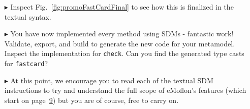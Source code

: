 \begin{itemize}
\vspace{0.5cm}

\item[$\blacktriangleright$] Inspect Fig.~\ref{fig:promoFastCardFinal} to see how this is finalized in the textual syntax.

\item[$\blacktriangleright$] You have now implemented every method using SDMs - fantastic work! Validate, export, and build
to generate the new code for your metamodel. Inspect the implementation for \texttt{check}.  Can you find the generated type casts for \texttt{fastcard}?

\item[$\blacktriangleright$] At this point, we encourage you to read each of the textual SDM instructions to try and understand the full scope of eMoflon's
features (which start on page~\hyperlink{page.9}{9}) but you are of course, free to carry on.


\end{itemize}
